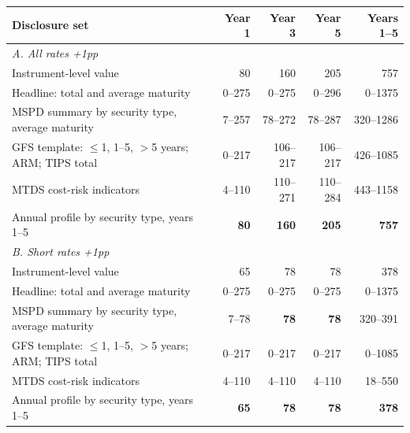 \begin{tabular}{lrrrr}
\toprule
Disclosure set & Year 1 & Year 3 & Year 5 & Years 1--5 \\
\midrule
\multicolumn{5}{l}{\textit{A. All rates +1pp}} \\
Instrument-level value & 80 & 160 & 205 & 757 \\
Headline: total and average maturity & 0--275 & 0--275 & 0--296 & 0--1375 \\
MSPD summary by security type, average maturity & 7--257 & 78--272 & 78--287 & 320--1286 \\
GFS template: $\le$1, 1--5, $>$5 years; ARM; TIPS total & 0--217 & 106--217 & 106--217 & 426--1085 \\
MTDS cost-risk indicators & 4--110 & 110--271 & 110--284 & 443--1158 \\
Annual profile by security type, years 1--5 & \textbf{80} & \textbf{160} & \textbf{205} & \textbf{757} \\
\midrule
\multicolumn{5}{l}{\textit{B. Short rates +1pp}} \\
Instrument-level value & 65 & 78 & 78 & 378 \\
Headline: total and average maturity & 0--275 & 0--275 & 0--275 & 0--1375 \\
MSPD summary by security type, average maturity & 7--78 & \textbf{78} & \textbf{78} & 320--391 \\
GFS template: $\le$1, 1--5, $>$5 years; ARM; TIPS total & 0--217 & 0--217 & 0--217 & 0--1085 \\
MTDS cost-risk indicators & 4--110 & 4--110 & 4--110 & 18--550 \\
Annual profile by security type, years 1--5 & \textbf{65} & \textbf{78} & \textbf{78} & \textbf{378} \\
\bottomrule
\end{tabular}
